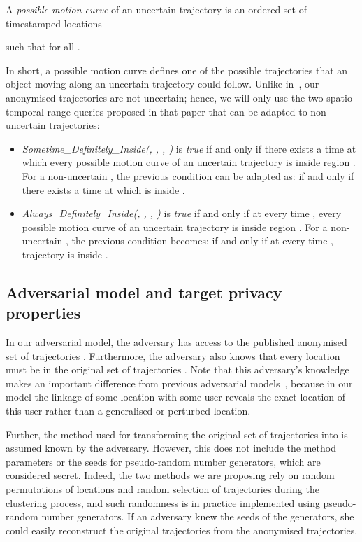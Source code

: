 \begin{definition}
A \emph{possible motion curve}  of an uncertain trajectory  is an ordered set of timestamped locations

such that  for all .
\end{definition}

In short, a possible motion curve defines one of the possible
trajectories that an object moving along
an uncertain trajectory could follow.
Unlike in~\cite{Trajcevski:2004:MUM:1016028.1016030},
our anonymised trajectories are not uncertain;
hence, we will only
use the two
spatio-temporal range queries proposed in that paper
that can be adapted to non-uncertain trajectories:

\begin{itemize}
\item \emph{Sometime\_Definitely\_Inside(, , , )}
    is \emph{true} if and only if
    there exists a time  at which
    every possible motion curve  of an uncertain trajectory
     is inside
    region . For a non-uncertain , the previous condition
    can be adapted as: if and only if
    there exists a time  at which
       is inside .
\item \emph{Always\_Definitely\_Inside(, , , )}
    is \emph{true} if and only if at every time , every
    possible motion curve  of an uncertain trajectory 
    is inside region . For a non-uncertain , the previous condition
    becomes: if and only if at every time , trajectory  is
	    inside .
\end{itemize}

\subsection{Adversarial model and target privacy properties}
\label{adversarial}

In our adversarial model, the adversary has access to the
published anonymised set of trajectories
. Furthermore, the adversary also knows that every
location  must be in
the original set of trajectories .
Note that this adversary's knowledge makes an
important difference from
previous adversarial models~\cite{abul08, nergiz09, monreale10, yarovoy09},
because in our model the linkage of some location
with some user reveals the exact location of
this user rather than a generalised or perturbed location.

Further, the method used for
transforming the original set
of trajectories  into  is
assumed known by the adversary. However, this does not
include the method parameters or the seeds for pseudo-random number generators, which are considered secret. Indeed, the two methods we
are proposing rely on random permutations of locations and
random selection of trajectories during the clustering process,
and such randomness is in practice implemented using pseudo-random number
generators.
If an adversary knew the seeds of the generators, she could
easily reconstruct the original trajectories from the anonymised
trajectories.

